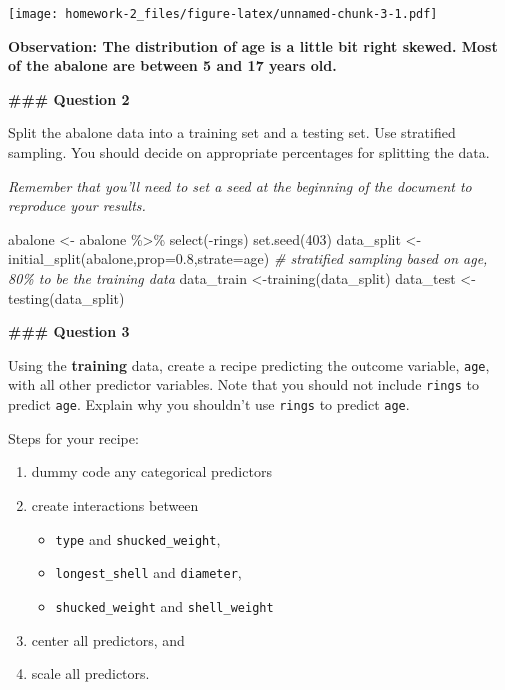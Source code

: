 \documentclass[
]{article}
\newenvironment{Shaded}{\begin{snugshade}}{\end{snugshade}}
\newcommand{\AttributeTok}[1]{\textcolor[rgb]{0.77,0.63,0.00}{#1}}
\newcommand{\CommentTok}[1]{\textcolor[rgb]{0.56,0.35,0.01}{\textit{#1}}}
\newcommand{\DecValTok}[1]{\textcolor[rgb]{0.00,0.00,0.81}{#1}}
\newcommand{\FloatTok}[1]{\textcolor[rgb]{0.00,0.00,0.81}{#1}}
\newcommand{\FunctionTok}[1]{\textcolor[rgb]{0.00,0.00,0.00}{#1}}
\newcommand{\NormalTok}[1]{#1}
\newcommand{\OtherTok}[1]{\textcolor[rgb]{0.56,0.35,0.01}{#1}}
\newcommand{\SpecialCharTok}[1]{\textcolor[rgb]{0.00,0.00,0.00}{#1}}
\providecommand{\tightlist}{%
  \setlength{\itemsep}{0pt}\setlength{\parskip}{0pt}}
\begin{document}
\texttt{[image: homework-2\_files/figure-latex/unnamed-chunk-3-1.pdf]}

\textbf{Observation: The distribution of age is a little bit right
skewed. Most of the abalone are between 5 and 17 years old.}

\textbf{\#\#\# Question 2}

Split the abalone data into a training set and a testing set. Use
stratified sampling. You should decide on appropriate percentages for
splitting the data.

\emph{Remember that you'll need to set a seed at the beginning of the
document to reproduce your results.}

\begin{Shaded}
\begin{Highlighting}[]
\NormalTok{abalone }\OtherTok{\textless{}{-}}\NormalTok{ abalone }\SpecialCharTok{\%\textgreater{}\%} \FunctionTok{select}\NormalTok{(}\SpecialCharTok{{-}}\NormalTok{rings)}
\FunctionTok{set.seed}\NormalTok{(}\DecValTok{403}\NormalTok{)}
\NormalTok{data\_split }\OtherTok{\textless{}{-}}\FunctionTok{initial\_split}\NormalTok{(abalone,}\AttributeTok{prop=}\FloatTok{0.8}\NormalTok{,}\AttributeTok{strate=}\NormalTok{age) }\CommentTok{\# stratified sampling based on age, 80\% to be the training data}
\NormalTok{data\_train }\OtherTok{\textless{}{-}}\FunctionTok{training}\NormalTok{(data\_split)}
\NormalTok{data\_test }\OtherTok{\textless{}{-}}\FunctionTok{testing}\NormalTok{(data\_split)}
\end{Highlighting}
\end{Shaded}

\textbf{\#\#\# Question 3}

Using the \textbf{training} data, create a recipe predicting the outcome
variable, \texttt{age}, with all other predictor variables. Note that
you should not include \texttt{rings} to predict \texttt{age}. Explain
why you shouldn't use \texttt{rings} to predict \texttt{age}.

Steps for your recipe:

\begin{enumerate}
\def\labelenumi{\arabic{enumi}.}
\item
  dummy code any categorical predictors
\item
  create interactions between

  \begin{itemize}
  \tightlist
  \item
    \texttt{type} and \texttt{shucked\_weight},
  \item
    \texttt{longest\_shell} and \texttt{diameter},
  \item
    \texttt{shucked\_weight} and \texttt{shell\_weight}
  \end{itemize}
\item
  center all predictors, and
\item
  scale all predictors.
\end{enumerate}
\end{document}
